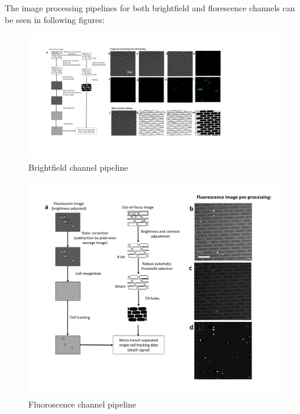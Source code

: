 \documentclass[pdftex,12pt,a4paper]{report}
\begin{document}
The image processing pipelines for both brightfield and florescence channels can be seen in following figures:


\begin{landscape}
\begin{figure}[H]
   \centering
    \includegraphics[height=0.95\textheight]{images/pipeline/01.pdf}
    \caption{Brightfield channel pipeline}
\end{figure}
\label{fig:pipeline1}
\end{landscape}

\begin{landscape}
\begin{figure}[H]
   \centering
    \includegraphics[height=\textheight]{images/pipeline/02.pdf}
    \caption{Fluoroscence channel pipeline}
\end{figure}
\label{fig:pipeline2}
\end{landscape}
\end{document}
